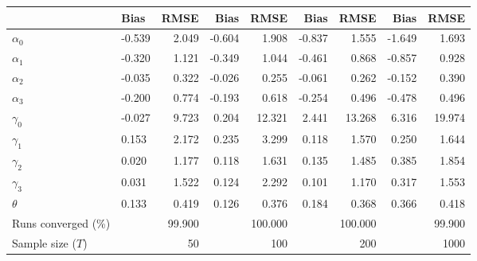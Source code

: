 
\begin{tabular}[t]{llrrrrrrr}
\toprule
  & Bias & RMSE & Bias & RMSE & Bias & RMSE & Bias & RMSE\\
\midrule
$\alpha_{0}$ & -0.539 & 2.049 & -0.604 & 1.908 & -0.837 & 1.555 & -1.649 & 1.693\\
$\alpha_{1}$ & -0.320 & 1.121 & -0.349 & 1.044 & -0.461 & 0.868 & -0.857 & 0.928\\
$\alpha_{2}$ & -0.035 & 0.322 & -0.026 & 0.255 & -0.061 & 0.262 & -0.152 & 0.390\\
$\alpha_{3}$ & -0.200 & 0.774 & -0.193 & 0.618 & -0.254 & 0.496 & -0.478 & 0.496\\
$\gamma_{0}$ & -0.027 & 9.723 & 0.204 & 12.321 & 2.441 & 13.268 & 6.316 & 19.974\\
$\gamma_{1}$ & 0.153 & 2.172 & 0.235 & 3.299 & 0.118 & 1.570 & 0.250 & 1.644\\
$\gamma_{2}$ & 0.020 & 1.177 & 0.118 & 1.631 & 0.135 & 1.485 & 0.385 & 1.854\\
$\gamma_{3}$ & 0.031 & 1.522 & 0.124 & 2.292 & 0.101 & 1.170 & 0.317 & 1.553\\
$\theta$ & 0.133 & 0.419 & 0.126 & 0.376 & 0.184 & 0.368 & 0.366 & 0.418\\
Runs converged (\%) &  & 99.900 &  & 100.000 &  & 100.000 &  & 99.900\\
Sample size ($T$) &  & 50 &  & 100 &  & 200 &  & 1000\\
\bottomrule
\end{tabular}
